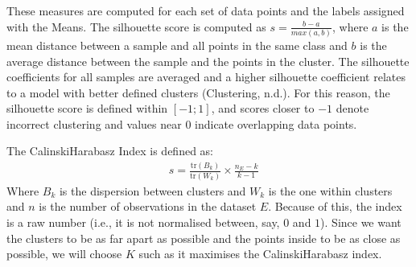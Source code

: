 \documentclass[letterpaper,10pt,english]{jupyterBook}
\begin{document}
\sphinxAtStartPar
These measures are computed for each set of data points and the labels assigned with the \sphinxhyphen{}Means. The silhouette score is computed as \(s = \frac{b - a}{max(a, b)}\), where \(a\) is the mean distance between a sample and all points in the same class and \(b\) is the average distance between the sample and the points in the  cluster. The silhouette coefficients for all samples are averaged and a higher silhouette coefficient relates to a model with better defined clusters (Clustering, n.d.). For this reason, the silhouette score is defined within \([-1;1]\), and scores closer to \(-1\) denote incorrect clustering and values near \(0\) indicate overlapping data points.

\sphinxAtStartPar
The Calinski\sphinxhyphen{}Harabasz Index is defined as:
\label{equation:04-stations_kmeans:b18a2d85-93af-4b3d-8787-67593a382c79}\begin{align}
& s = \frac{\mathrm{tr}(B_k)}{\mathrm{tr}(W_k)} \times \frac{n_E - k}{k - 1}
\end{align}
\sphinxAtStartPar
Where \(B_k\) is the dispersion between clusters and \(W_k\) is the one within clusters and \(n\) is the number of observations in the dataset \(E\). Because of this, the index is a raw number (i.e., it is not normalised between, say, \(0\) and \(1\)). Since we want the clusters to be as far apart as possible and the points inside to be as close as possible, we will choose \(K\) such as it maximises the Calinski\sphinxhyphen{}Harabasz index.
\end{document}
